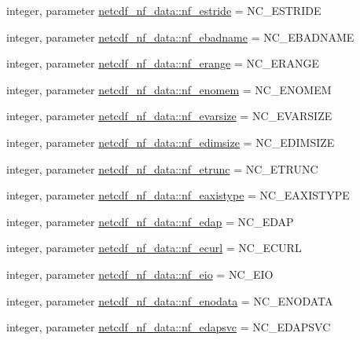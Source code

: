 \begin{DoxyCompactItemize}
integer, parameter \hyperlink{namespacenetcdf__nf__data_ae24b92b5a7828b150aa050e6c70b8a17}{netcdf\+\_\+nf\+\_\+data\+::nf\+\_\+estride} = N\+C\+\_\+\+E\+S\+T\+R\+I\+DE
\item 
integer, parameter \hyperlink{namespacenetcdf__nf__data_a16e1cb2dc360db0353072ec35b03f232}{netcdf\+\_\+nf\+\_\+data\+::nf\+\_\+ebadname} = N\+C\+\_\+\+E\+B\+A\+D\+N\+A\+ME
\item 
integer, parameter \hyperlink{namespacenetcdf__nf__data_a75a25a80c5f8974464999a47389737af}{netcdf\+\_\+nf\+\_\+data\+::nf\+\_\+erange} = N\+C\+\_\+\+E\+R\+A\+N\+GE
\item 
integer, parameter \hyperlink{namespacenetcdf__nf__data_aa417fbc2f2916ce82a24afaa423f4b49}{netcdf\+\_\+nf\+\_\+data\+::nf\+\_\+enomem} = N\+C\+\_\+\+E\+N\+O\+M\+EM
\item 
integer, parameter \hyperlink{namespacenetcdf__nf__data_abfc9de7f63b46d3bd7c239e0ca9118a4}{netcdf\+\_\+nf\+\_\+data\+::nf\+\_\+evarsize} = N\+C\+\_\+\+E\+V\+A\+R\+S\+I\+ZE
\item 
integer, parameter \hyperlink{namespacenetcdf__nf__data_a8185d116977ecbf524ef2dbdb9694c82}{netcdf\+\_\+nf\+\_\+data\+::nf\+\_\+edimsize} = N\+C\+\_\+\+E\+D\+I\+M\+S\+I\+ZE
\item 
integer, parameter \hyperlink{namespacenetcdf__nf__data_a02d860091caaa38ac7044f3920366b5c}{netcdf\+\_\+nf\+\_\+data\+::nf\+\_\+etrunc} = N\+C\+\_\+\+E\+T\+R\+U\+NC
\item 
integer, parameter \hyperlink{namespacenetcdf__nf__data_a7b63825166c22986986ee0b76e587990}{netcdf\+\_\+nf\+\_\+data\+::nf\+\_\+eaxistype} = N\+C\+\_\+\+E\+A\+X\+I\+S\+T\+Y\+PE
\item 
integer, parameter \hyperlink{namespacenetcdf__nf__data_a457a2431132da75ad9a0dbd161e864e8}{netcdf\+\_\+nf\+\_\+data\+::nf\+\_\+edap} = N\+C\+\_\+\+E\+D\+AP
\item 
integer, parameter \hyperlink{namespacenetcdf__nf__data_a5316537c3ed2e5b72696fab1ed502cfc}{netcdf\+\_\+nf\+\_\+data\+::nf\+\_\+ecurl} = N\+C\+\_\+\+E\+C\+U\+RL
\item 
integer, parameter \hyperlink{namespacenetcdf__nf__data_a9def0b3173a119099c1a6576bdbdb7da}{netcdf\+\_\+nf\+\_\+data\+::nf\+\_\+eio} = N\+C\+\_\+\+E\+IO
\item 
integer, parameter \hyperlink{namespacenetcdf__nf__data_a1c0065c6e07690631776621490e07f5f}{netcdf\+\_\+nf\+\_\+data\+::nf\+\_\+enodata} = N\+C\+\_\+\+E\+N\+O\+D\+A\+TA
\item 
integer, parameter \hyperlink{namespacenetcdf__nf__data_a7d19dcdde17507043c6078f7a1e3d2e8}{netcdf\+\_\+nf\+\_\+data\+::nf\+\_\+edapsvc} = N\+C\+\_\+\+E\+D\+A\+P\+S\+VC

\end{DoxyCompactItemize}
